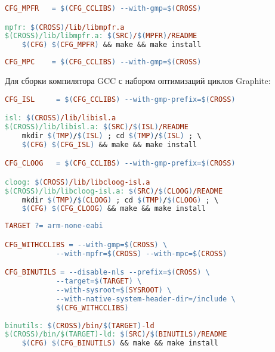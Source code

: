 \begin{lstlisting}[language=make]
CFG_MPFR   = $(CFG_CCLIBS) --with-gmp=$(CROSS)

mpfr: $(CROSS)/lib/libmpfr.a
$(CROSS)/lib/libmpfr.a: $(SRC)/$(MPFR)/README
	$(CFG) $(CFG_MPFR) && make && make install
\end{lstlisting}

\begin{lstlisting}[language=make]
CFG_MPC    = $(CFG_CCLIBS) --with-gmp=$(CROSS)
\end{lstlisting}

Для сборки компилятора GCC с набором оптимизаций циклов Graphite:

\begin{lstlisting}[language=make]
CFG_ISL		= $(CFG_CCLIBS) --with-gmp-prefix=$(CROSS)

isl: $(CROSS)/lib/libisl.a
$(CROSS)/lib/libisl.a: $(SRC)/$(ISL)/README
	mkdir $(TMP)/$(ISL) ; cd $(TMP)/$(ISL) ; \ 
	$(CFG) $(CFG_ISL) && make && make install

CFG_CLOOG	= $(CFG_CCLIBS) --with-gmp-prefix=$(CROSS)

cloog: $(CROSS)/lib/libcloog-isl.a
$(CROSS)/lib/libcloog-isl.a: $(SRC)/$(CLOOG)/README
	mkdir $(TMP)/$(CLOOG) ; cd $(TMP)/$(CLOOG) ; \ 
	$(CFG) $(CFG_CLOOG) && make && make install
\end{lstlisting}

\clearpage
\begin{lstlisting}[language=make]
TARGET ?= arm-none-eabi

CFG_WITHCCLIBS = --with-gmp=$(CROSS) \
			--with-mpfr=$(CROSS) --with-mpc=$(CROSS)

CFG_BINUTILS = --disable-nls --prefix=$(CROSS) \
			--target=$(TARGET) \
			--with-sysroot=$(SYSROOT) \
			--with-native-system-header-dir=/include \
			$(CFG_WITHCCLIBS)
 
binutils: $(CROSS)/bin/$(TARGET)-ld
$(CROSS)/bin/$(TARGET)-ld: $(SRC)/$(BINUTILS)/README
	$(CFG) $(CFG_BINUTILS) && make && make install
\end{lstlisting}

